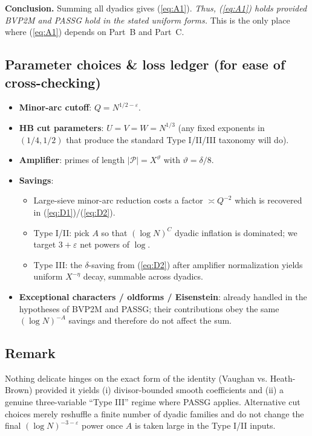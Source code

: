 \documentclass[11pt]{article}
\def\eqref#1{(\ref{#1})}%
\theoremstyle{definition}
\theoremstyle{remark}
\numberwithin{equation}{part}
\begin{document}
\medskip
\noindent\textbf{Conclusion.} Summing all dyadics gives \eqref{eq:A1}. \emph{Thus, \eqref{eq:A1} holds provided BVP2M and PASSG hold in the stated uniform forms.} This is the only place where \eqref{eq:A1} depends on Part~B and Part~C.

\subsection{Parameter choices \& loss ledger (for ease of cross-checking)}

\begin{itemize}
	\item \textbf{Minor-arc cutoff}: $Q=N^{1/2-\varepsilon}$.
	\item \textbf{HB cut parameters}: $U=V=W=N^{1/3}$ (any fixed exponents in $(1/4,1/2)$ that produce the standard Type I/II/III taxonomy will do).
	\item \textbf{Amplifier}: primes of length $|\mathcal P|=X^\vartheta$ with $\vartheta=\delta/8$.
	\item \textbf{Savings}:
	      \begin{itemize}
		      \item Large-sieve minor-arc reduction costs a factor $\asymp Q^{-2}$ which is recovered in \eqref{eq:D1}/\eqref{eq:D2}.
		      \item Type I/II: pick $A$ so that $(\log N)^C$ dyadic inflation is dominated; we target $3+\varepsilon$ net powers of $\log$.
		      \item Type III: the $\delta$-saving from \eqref{eq:D2} after amplifier normalization yields uniform $X^{-\eta}$ decay, summable across dyadics.
	      \end{itemize}
	\item \textbf{Exceptional characters / oldforms / Eisenstein}: already handled in the hypotheses of BVP2M and PASSG; their contributions obey the same $(\log N)^{-A}$ savings and therefore do not affect the sum.
\end{itemize}

\subsection{Remark}

Nothing delicate hinges on the exact form of the identity (Vaughan vs. Heath-Brown) provided it yields (i) divisor-bounded smooth coefficients and (ii) a genuine three-variable “Type III” regime where PASSG applies. Alternative cut choices merely reshuffle a finite number of dyadic families and do not change the final $(\log N)^{-3-\varepsilon}$ power once $A$ is taken large in the Type I/II inputs.
\end{document}
